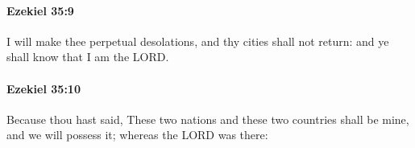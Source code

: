 		\paragraph{Ezekiel 35:9} %
			\label{EZEKIEL-35-9}

			I will make thee perpetual desolations, and thy cities shall not return: and ye shall know that I am the LORD.


		\paragraph{Ezekiel 35:10} %
			\label{EZEKIEL-35-10}

			Because thou hast said, These two nations and these two countries shall be mine, and we will possess it; whereas the LORD was there:


